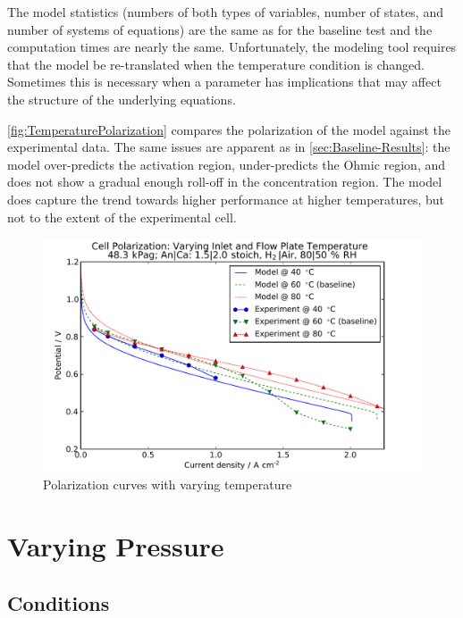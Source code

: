 The model statistics (numbers of both types of variables, number of states, and number of systems of equations) are the same as for the baseline test and the computation times are nearly the same.  Unfortunately, the modeling tool requires that the model be re-translated when the temperature condition is changed.  Sometimes this is necessary when a parameter has implications that may affect the structure of the underlying equations.

\autoref{fig:TemperaturePolarization} compares the polarization of the model against the experimental data.  The same issues are apparent as in \autoref{sec:Baseline-Results}: the model over-predicts the activation region, under-predicts the Ohmic region, and does not show a gradual enough roll-off in the concentration region.  The model does capture the trend towards higher performance at higher temperatures, but not to the extent of the experimental cell.

\begin{figure}[htbp]
  \includegraphics[width=\linewidth]{Results/Cell/Model/Temperature/Polarization}%
  \caption{Polarization curves with varying temperature}%
  \label{fig:TemperaturePolarization}
\end{figure}



\FloatBarrier %
\section{Varying Pressure}

\subsection{Conditions}


